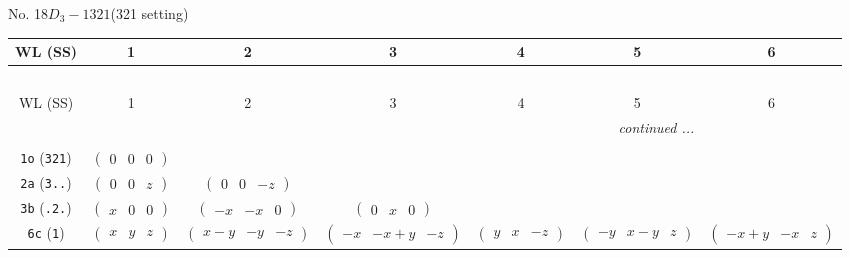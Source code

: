 \documentclass[fleqn,9pt,landscape]{jsarticle}
\begin{document}
\newpage
No. 18\quad$D_{3}-1$\quad$321$\quad(321 setting)\quad[ trigonal ]
\begin{center}
\renewcommand{\arraystretch}{1.2}
\begin{longtable}{ccccccc}
 \hline \hline
WL (SS) & 1 & 2 & 3 & 4 & 5 & 6 \\ \hline \endfirsthead

\multicolumn{6}{l}{\tablename\ \thetable{}} \\
 \hline \hline
WL (SS) & 1 & 2 & 3 & 4 & 5 & 6 \\ \hline \endhead

 \hline \hline
\multicolumn{6}{r}{\footnotesize\it continued ...} \\ \endfoot

 \hline \hline
\multicolumn{6}{r}{} \\ \endlastfoot

{\tt 1o} ({\tt 321}) & $ \begin{pmatrix} 0 & 0 & 0 \end{pmatrix} $ & $  $ & $  $ & $  $ & $  $ & $  $ \\ \hline
{\tt 2a} ({\tt 3..}) & $ \begin{pmatrix} 0 & 0 & z \end{pmatrix} $ & $ \begin{pmatrix} 0 & 0 & - z \end{pmatrix} $ & $  $ & $  $ & $  $ & $  $ \\ \hline
{\tt 3b} ({\tt .2.}) & $ \begin{pmatrix} x & 0 & 0 \end{pmatrix} $ & $ \begin{pmatrix} - x & - x & 0 \end{pmatrix} $ & $ \begin{pmatrix} 0 & x & 0 \end{pmatrix} $ & $  $ & $  $ & $  $ \\ \hline
{\tt 6c} ({\tt 1}) & $ \begin{pmatrix} x & y & z \end{pmatrix} $ & $ \begin{pmatrix} x - y & - y & - z \end{pmatrix} $ & $ \begin{pmatrix} - x & - x + y & - z \end{pmatrix} $ & $ \begin{pmatrix} y & x & - z \end{pmatrix} $ & $ \begin{pmatrix} - y & x - y & z \end{pmatrix} $ & $ \begin{pmatrix} - x + y & - x & z \end{pmatrix} $ \\
\end{longtable}
\end{center}
\end{document}
